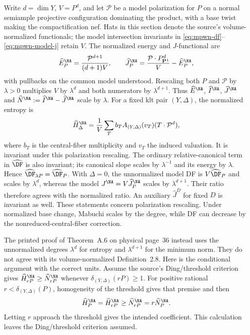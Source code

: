 Write $d=\dim Y$, $V=P^d$, and let $\mathcal P$ be a model
polarization for $P$ on a normal semiample projective
configuration dominating the product, with a base twist
making the compactification nef. Hats in this section
denote the source's volume-normalized functionals; the model
intersection invariants in \eqref{eq:mpwn-df}--\eqref{eq:mpwn-model-j}
retain $V$. The normalized energy and $J$-functional are
\[
 \widehat E^{\NA}_P=\frac{\mathcal P^{d+1}}{(d+1)V},\qquad
 \widehat J^{\NA}_P=\frac{\mathcal P\cdot P_{\mathbf P^1}^{d}}{V}
             -\widehat E^{\NA}_P,
\]
with pullbacks on the common model understood. Rescaling both
$P$ and $\mathcal P$ by $\lambda>0$ multiplies $V$ by
$\lambda^d$ and both numerators by $\lambda^{d+1}$.
Thus $\widehat E^{\NA}$, $\widehat I^{\NA}$, $\widehat J^{\NA}$ and
$\widehat N^{\NA}:=\widehat I^{\NA}-\widehat J^{\NA}$ scale by $\lambda$.
For a fixed klt pair $(Y,\Delta)$, the normalized entropy is
\[
 \widehat H^{\NA}_\Delta
 =\frac{1}{V}\sum_T b_T A_{(Y,\Delta)}(v_T)
                      (T\cdot\mathcal P^d),
\]
where $b_T$ is the central-fiber multiplicity and $v_T$ the
induced valuation. It is invariant under this polarization
rescaling. The ordinary
relative-canonical term in $\widehat{\DF}$ is also invariant;
its canonical slope scales by $\lambda^{-1}$ and its energy
by $\lambda$. Hence $\widehat{\DF}_{\lambda P}=\widehat{\DF}_P$.
With $\Delta=0$, the unnormalized model DF is
$V\widehat{\DF}_P$ and scales by $\lambda^d$, whereas the
model $J^{\NA}=V\widehat J^{\NA}_P$ scales by $\lambda^{d+1}$.
Their ratio therefore agrees with the normalized ratio.
An auxiliary $\widehat J^D$ for fixed $D$ is invariant as well. These statements
concern polarization rescaling. Under normalized base change,
Mabuchi scales by the degree, while DF can decrease by the
nonreduced-central-fiber correction.

The printed proof of Theorem~A.6 on physical page~36 instead
uses the unnormalized degrees $\lambda^d$ for entropy and
$\lambda^{d+1}$ for the minimum norm. They do not agree with
its volume-normalized Definition~2.8. Here is the conditional
argument with the correct units. Assume the source's
Ding/threshold criterion gives $\widehat H^{\NA}_{rP}\geq\widehat N^{\NA}_{rP}$
whenever $\delta_{(Y,\Delta)}(rP)\geq1$.
For positive rational $r<\delta_{(Y,\Delta)}(P)$, homogeneity
of the threshold gives that premise and then
\[
 \widehat H^{\NA}_P=\widehat H^{\NA}_{rP}
 \geq\widehat N^{\NA}_{rP}=r\widehat N^{\NA}_P.
\]
Letting $r$ approach the threshold gives the intended coefficient.
This calculation leaves the Ding/threshold criterion assumed.

